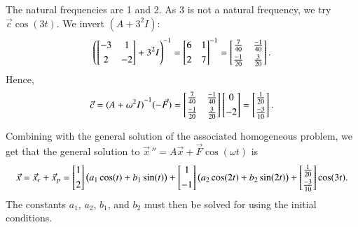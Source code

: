 \documentclass[12pt]{book}
\begin{document}
\begin{example}
The natural frequencies are 1 and 2.  As 3 is not a
natural frequency, we try $\vec{c} \cos (3t)$.
We invert $(A+3^2 I)$:
\begin{equation*}
{\left( \begin{bmatrix}
-3 & 1 \\
\noalign{\smallskip}
2 & -2
\end{bmatrix}
+3^2 I\right)}^{-1}
=
{\begin{bmatrix}
6 & 1 \\
\noalign{\smallskip}
2 & 7
\end{bmatrix}}^{-1}
=
\begin{bmatrix}
\frac{7}{40} & \frac{-1}{40} \\
\noalign{\smallskip}
\frac{-1}{20} & \frac{3}{20}
\end{bmatrix} .
\end{equation*}
Hence,
\begin{equation*}
\vec{c} = 
{(A +\omega^2 I)}^{-1}
(-\vec{F} ) = 
\begin{bmatrix}
\frac{7}{40} & \frac{-1}{40} \\
\noalign{\smallskip}
\frac{-1}{20} & \frac{3}{20}
\end{bmatrix}
\begin{bmatrix}
0 \\
\noalign{\smallskip}
-2
\end{bmatrix}
=
\begin{bmatrix}
\frac{1}{20} \\
\noalign{\smallskip}
\frac{-3}{10}
\end{bmatrix} .
\end{equation*}

Combining with the general solution of the associated
homogeneous problem, we get that the general solution to
${\vec{x}\,}'' = A \vec{x} + \vec{F} \cos (\omega t)$ is
\begin{equation*}
\vec{x} = \vec{x}_c + \vec{x}_p =
\begin{bmatrix} 1 \\
\noalign{\smallskip}
2 \end{bmatrix}
\bigl( a_1 \cos (t) + b_1 \sin (t) \bigr)
+
\begin{bmatrix} 1 \\
\noalign{\smallskip}
-1 \end{bmatrix}
\bigl( a_2 \cos (2t) + b_2 \sin (2t) \bigr)
+
\begin{bmatrix}
\frac{1}{20} \\
\noalign{\smallskip}
\frac{-3}{10}
\end{bmatrix}
\cos (3t) .
\end{equation*}
The constants $a_1$, $a_2$, $b_1$, and $b_2$ must then be solved for using
the initial conditions.
\end{example}
\end{document}
